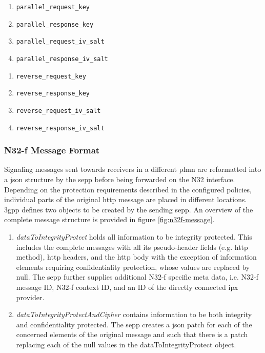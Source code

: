 \begin{minipage}[l]{0.5\textwidth}
    \begin{enumerate}[label=--]
        \item \texttt{parallel\_request\_key}
        \item \texttt{parallel\_response\_key}
        \item \texttt{parallel\_request\_iv\_salt}
        \item \texttt{parallel\_response\_iv\_salt}
    \end{enumerate}
\end{minipage}%
\begin{minipage}[r]{0.5\textwidth}
    \begin{enumerate}[label=--]
        \item \texttt{reverse\_request\_key}
        \item \texttt{reverse\_response\_key}
        \item \texttt{reverse\_request\_iv\_salt}
        \item \texttt{reverse\_response\_iv\_salt}
    \end{enumerate}
\end{minipage}

\subsubsection{N32-f Message Format}

Signaling messages sent towards receivers in a different \gls{plmn} are reformatted into a \gls{json} structure by the \gls{sepp} before being forwarded on the N32 interface.
Depending on the protection requirements described in the configured policies, individual parts of the original \gls{http} message are placed in different locations.
\gls{3gpp} defines two objects to be created by the sending \gls{sepp}.
An overview of the complete message structure is provided in figure \ref{fig:n32f-message}.

\begin{enumerate}[label=--]
    \item \textit{dataToIntegrityProtect} holds all information to be integrity protected.
    This includes the complete messages with all its pseudo-header fields (e.g. \gls{http} method), \gls{http} headers, and the \gls{http} body with the exception of information elements requiring confidentiality protection, whose values are replaced by null.
    The \gls{sepp} further supplies additional N32-f specific meta data, i.e. N32-f message ID, N32-f context ID, and an ID of the directly connected \gls{ipx} provider.

    \item \textit{dataToIntegrityProtectAndCipher} contains information to be both integrity and confidentiality protected.
    The \gls{sepp} creates a \gls{json} patch for each of the concerned elements of the original message and such that there is a patch replacing each of the null values in the dataToIntegrityProtect object.
\end{enumerate}

